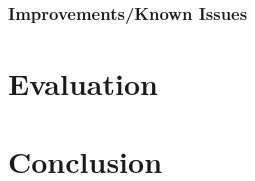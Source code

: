 \documentclass[a4paper,12pt,pdftex,halfparskip,cleardoubleempty,bibtotoc,liststotoc]{scrbook}
\begin{document}
\subsection{Improvements/Known Issues}


\chapter{Evaluation}




\chapter{Conclusion}

\printbibliography
\end{document}
